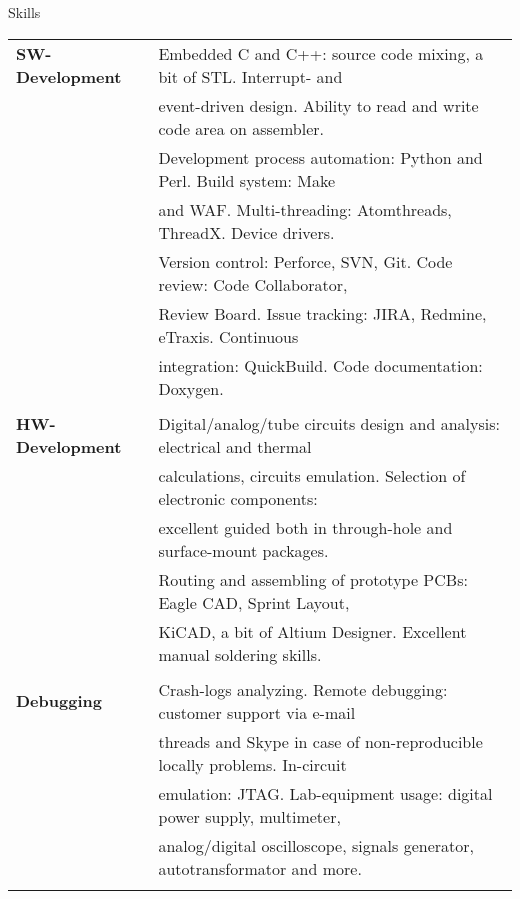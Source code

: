 \documentclass{template}
\begin{document}

\begin{rSection}{Skills}

\begin{tabular}{ @{} >{\bfseries}l @{\hspace{6ex}} l }
SW-Development  & Embedded C and C++: source code mixing, a bit of STL. Interrupt- and \\
                & event-driven design. Ability to read and write code area on assembler. \\
                & Development process automation: Python and Perl. Build system: Make \\
                & and WAF. Multi-threading: Atomthreads, ThreadX. Device drivers. \\
                & Version control: Perforce, SVN, Git. Code review: Code Collaborator, \\
                & Review Board. Issue tracking: JIRA, Redmine, eTraxis. Continuous \\
                & integration: QuickBuild. Code documentation: Doxygen. \\ \\

HW-Development  & Digital/analog/tube circuits design and analysis: electrical and thermal \\
                & calculations, circuits emulation. Selection of electronic components: \\
                & excellent guided both in through-hole and surface-mount packages. \\
                & Routing and assembling of prototype PCBs: Eagle CAD, Sprint Layout, \\
                & KiCAD, a bit of Altium Designer. Excellent manual soldering skills. \\ \\

Debugging       & Crash-logs analyzing. Remote debugging: customer support via e-mail \\
                & threads and Skype in case of non-reproducible locally problems. In-circuit \\
                & emulation: JTAG. Lab-equipment usage: digital power supply, multimeter, \\
                & analog/digital oscilloscope, signals generator, autotransformator and more. \\ \\


\end{tabular}
\end{rSection}
\end{document}

